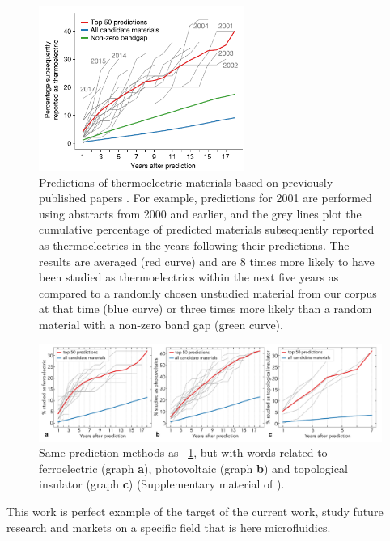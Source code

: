 \begin{figure}[]
	\centering
	\includegraphics[width=0.6\textwidth]{imgs/Tshitoyan2019_Material_Predictions_02}
	\caption{Predictions of thermoelectric materials based on previously published papers  \cite{Tshitoyan2019}.
		\newline
		For example, predictions for 2001 are performed using abstracts from 2000 and earlier, and the grey lines plot the cumulative percentage of predicted materials subsequently reported as thermoelectrics in the years following their predictions.
		The results are averaged (red curve) and are 8 times more likely to have been studied as thermoelectrics within the next five years as compared to a randomly chosen unstudied material from our corpus at that time (blue curve) or three times more likely than a random material with a non-zero band gap (green curve).
	}
	\label{MaterialPrediction02}
\end{figure}

\begin{figure}[]
	\centering
	\includegraphics[width=1.2\textwidth]{imgs/Tshitoyan2019_Material_Predictions_03}
	\caption{Same prediction methods as \fig~\ref{MaterialPrediction02}, but with words related to ferroelectric (graph \textbf{a}), photovoltaic (graph \textbf{b}) and topological insulator  (graph \textbf{c}) (Supplementary material of \cite{Tshitoyan2019}). }
	\label{MaterialPrediction03}
\end{figure}


This work is perfect example of the target of the current work, \ie study future research and markets on a specific field that is here microfluidics. 
